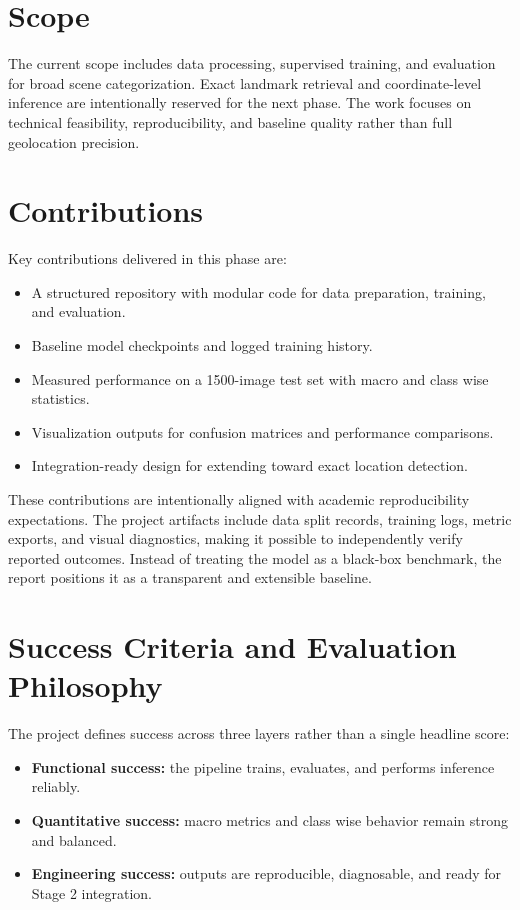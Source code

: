 \section{Scope}
The current scope includes data processing, supervised training, and evaluation for broad scene categorization. Exact landmark retrieval and coordinate-level inference are intentionally reserved for the next phase. The work focuses on technical feasibility, reproducibility, and baseline quality rather than full geolocation precision.

\section{Contributions}
Key contributions delivered in this phase are:
\begin{itemize}
\item A structured repository with modular code for data preparation, training, and evaluation.
\item Baseline model checkpoints and logged training history.
\item Measured performance on a 1500-image test set with macro and class wise statistics.
\item Visualization outputs for confusion matrices and performance comparisons.
\item Integration-ready design for extending toward exact location detection.
\end{itemize}

These contributions are intentionally aligned with academic reproducibility expectations. The project artifacts include data split records, training logs, metric exports, and visual diagnostics, making it possible to independently verify reported outcomes. Instead of treating the model as a black-box benchmark, the report positions it as a transparent and extensible baseline.

\section{Success Criteria and Evaluation Philosophy}
The project defines success across three layers rather than a single headline score:
\begin{itemize}
\item \textbf{Functional success:} the pipeline trains, evaluates, and performs inference reliably.
\item \textbf{Quantitative success:} macro metrics and class wise behavior remain strong and balanced.
\item \textbf{Engineering success:} outputs are reproducible, diagnosable, and ready for Stage 2 integration.
\end{itemize}

